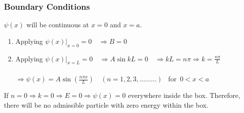   \subsubsection{Boundary Conditions}
  $\psi(x)$ will be continuous at $x=0$ and $x=a$.
  \begin{enumerate}
  	\item Applying $\left.\psi(x)\right|_{x=0}=0 \quad \Rightarrow B=0$
  	\item Applying $\left.\psi(x)\right|_{x=L}=0 \quad \Rightarrow A \sin k L=0 \quad \Rightarrow k L=n \pi \Rightarrow k=\frac{n \pi}{L}$\\\\
  	$\Rightarrow \psi(x)=A \sin \left(\frac{n \pi {x}}{L}\right)\quad (n=1,2,3, \ldots \ldots \ldots)$ \ for\ $0<x<a$
  \end{enumerate}
  If $n=0 \Rightarrow k=0 \Rightarrow E=0 \Rightarrow \psi(x)=0$ everywhere inside the box. Therefore, there will be no admissible particle with zero energy within the box.
  \begin{center}
  \end{center}
